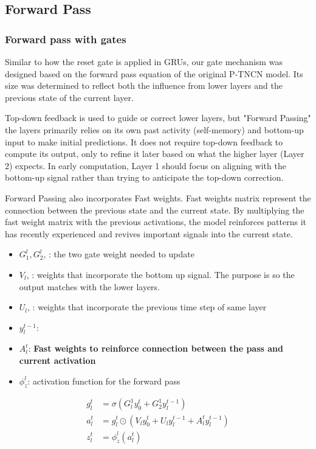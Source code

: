 \documentclass{article}
\begin{document}
\subsection{Forward Pass}
\subsubsection{Forward pass with gates}
\hspace*{.5cm} Similar to how the reset gate is applied in GRUs, our gate mechanism was designed based on the forward pass equation of the original P-TNCN model. Its size was determined to reflect both the influence from lower layers and the previous state of the current layer.

Top-down feedback is used to guide or correct lower layers, but "Forward Passing" the layers primarily relies on its own past activity (self-memory) and bottom-up input to make initial predictions.
It does not require top-down feedback to compute its output, only to refine it later based on what the higher layer (Layer 2) expects.
In early computation, Layer 1 should focus on aligning with the bottom-up signal rather than trying to anticipate the top-down correction.

Forward Passing also incorporates Fast weights. Fast weights matrix represent the connection between the previous state and the current state. By multiplying the fast weight matrix with the previous activations, the model reinforces patterns it has recently experienced and revives important signals into the current state. 


\begin{itemize}
    \item $G^l_1, G^l_2$, : the two gate weight needed to update 
    \item $V_l$, : weights that incorporate the bottom up signal. The purpose is so the output matches with the lower layers. 
    \item $U_l$, :  weights that incorporate the previous time step of same layer 
    \item $y_l^{t-1}$:
    \item $A^t_l$: \textbf{Fast weights to reinforce connection between the pass and current activation}
    \item $\phi_z^l$: activation function for the forward pass
\end{itemize}
\begin{align}
g_l^t &= \sigma(G_l^1 y_0^t + G_2^1 y_l^{t-1}) \\
a_l^t &= g_l^t \odot \left(V_l y_0^t + U_l y_l^{t-1} + A_l^t y_l^{t-1} \right) \\
z_l^t &= \phi_z^l(a_l^t)
\end{align}
\end{document}

